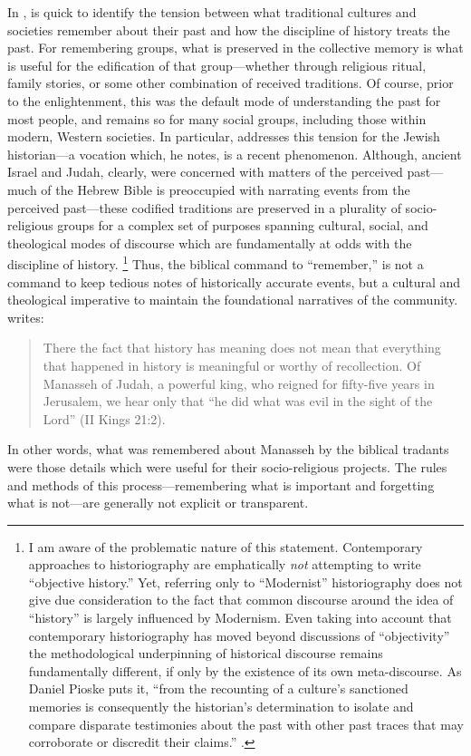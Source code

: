 In , \yerushalmi is quick to identify the tension between what traditional cultures and societies remember about their past and how the discipline of history treats the past. For remembering groups, what is preserved in the collective memory is what is useful for the edification of that group---whether through religious ritual, family stories, or some other combination of received traditions. Of course, prior to the enlightenment, this was the default mode of understanding the past for most people, and remains so for many social groups, including those within modern, Western societies. In particular, \yerushalmi addresses this tension for the Jewish historian---a vocation which, he notes, is a recent phenomenon.%
    \autocite[81--103]{yerushalmi1989}
Although, ancient Israel and Judah, clearly, were concerned with matters of the perceived past---much of the Hebrew Bible is preoccupied with narrating events from the perceived past---these codified traditions are preserved in a plurality of socio-religious groups for a complex set of purposes spanning cultural, social, and theological modes of discourse which are fundamentally at odds with the discipline of history.%
    \footnote{%
        I am aware of the problematic nature of this statement. Contemporary approaches to historiography are emphatically \emph{not} attempting to write ``objective history.'' Yet, referring only to ``Modernist'' historiography does not give due consideration to the fact that common discourse around the idea of ``history'' is largely influenced by Modernism. Even taking into account that contemporary historiography has moved beyond discussions of ``objectivity'' the methodological underpinning of historical discourse remains fundamentally different, if only by the existence of its own meta-discourse. As Daniel Pioske puts it, ``from the recounting of a culture's sanctioned memories is consequently the historian's determination to isolate and compare disparate testimonies about the past with other past traces that may corroborate or discredit their claims.''
        \cite[12--13]{pioske_bibint2015}.}
Thus, the biblical command to ``remember,'' is not a command to keep tedious notes of historically accurate events, but a cultural and theological imperative to maintain the foundational narratives of the community. \yerushalmi writes:  

\begin{quote}
    There the fact that history has meaning does not mean that everything that happened in history is meaningful or worthy of recollection. Of Manasseh of Judah, a powerful king, who reigned for fifty-five years in Jerusalem, we hear only that ``he did what was evil in the sight of the Lord'' (II Kings 21:2).%
        \autocite[10]{yerushalmi1989}
\end{quote}  
\noindent
In other words, what was remembered about Manasseh by the biblical tradants were those details which were useful for their socio-religious projects. The rules and methods of this process---remembering what is important and forgetting what is not---are generally not explicit or transparent.  

